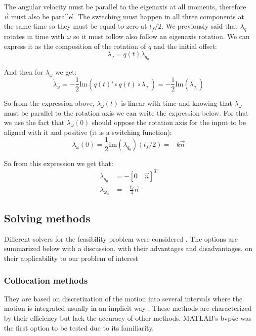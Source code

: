 The angular velocity must be parallel to the eigenaxis at all moments, therefore $\vec{u}$ must also be parallel. The switching must happen in all three components at the same time so they must be equal to zero at $t_f/2$. We previously said that $\lambda_q$ rotates in time with $\omega$ so it must follow also follow an eigenaxis rotation. We can express it as the composition of the rotation of $q$ and the initial offset:
\begin{equation}
\lambda_q = q(t) \lambda_{q_0}
\end{equation}

And then for $\lambda_\omega$ we get:
\begin{equation}
\dot{\lambda}_\omega = -\frac{1}{2} \text{Im}(q(t)' \circ q(t) \circ \lambda_{q_0}) = -\frac{1}{2} \text{Im}(\lambda_{q_0})
\end{equation}

So from the expression above, $\lambda_{\omega}(t)$ is linear with time and knowing that $\lambda_{\omega}$ must be parallel to the rotation axis we can write the expression below. For that we use the fact that $\lambda_{\omega}(0)$ should oppose the rotation axis for the input to be aligned with it and positive (it is a switching function):
\begin{equation*}
\lambda_{\omega}(0) = \frac{1}{2} \text{Im}(\lambda_{q_0}) (t_f/2) = - k \vec{n}
\end{equation*}

So from this expression we get that:
\begin{align}
\lambda_{q_0} &= - [0 \quad \vec{n}]^T\\
\lambda_{\omega_0} &= -\frac{t_f}{4} \vec{n}
\end{align}

\subsection{Solving methods}
Different solvers for the feasibility problem were considered . The options are summarized below with a discussion, with their advantages and disadvantages, on their applicability to our problem of interest

\subsubsection{Collocation methods} 
They are based on discretization of the motion into several intervals where the motion is integrated usually in an implicit way \cite{betts2010practical}. These methods are characterized by their efficiency but lack the accuracy of other methods. MATLAB's bvp4c was the first option to be tested due to its familiarity.

